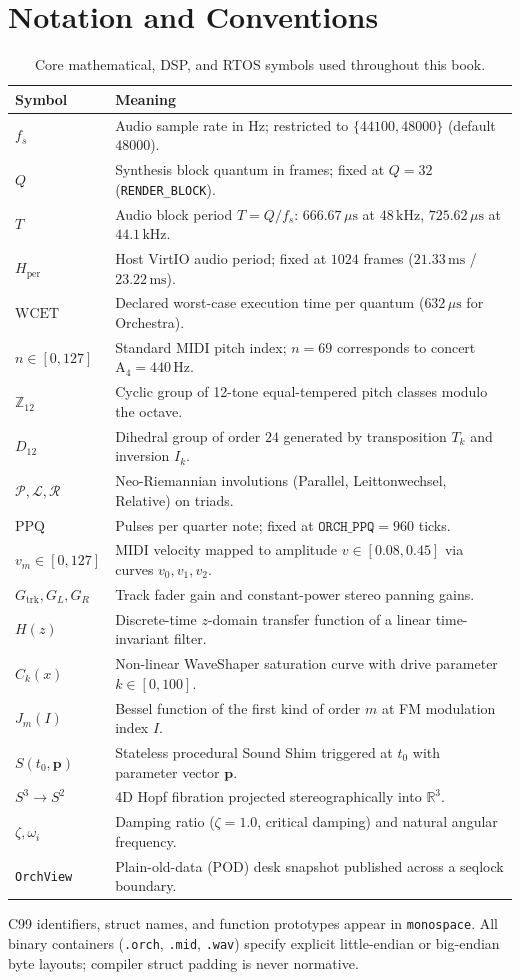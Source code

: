 \chapter{Notation and Conventions}

\begin{table}[htbp]
\centering
\caption{Core mathematical, DSP, and RTOS symbols used throughout this book.}
\begin{tabular}{@{}lp{9.6cm}@{}}
\toprule
Symbol & Meaning \\
\midrule
$f_s$ & Audio sample rate in Hz; restricted to $\{44100, 48000\}$ (default $48000$). \\
$Q$ & Synthesis block quantum in frames; fixed at $Q = 32$ (\texttt{RENDER\_BLOCK}). \\
$T$ & Audio block period $T = Q/f_s$: $666.67\,\mu\text{s}$ at $48\,\text{kHz}$, $725.62\,\mu\text{s}$ at $44.1\,\text{kHz}$. \\
$H_{\text{per}}$ & Host VirtIO audio period; fixed at $1024$ frames ($21.33\,\text{ms}$ / $23.22\,\text{ms}$). \\
$\mathrm{WCET}$ & Declared worst-case execution time per quantum ($632\,\mu\text{s}$ for Orchestra). \\
$n \in [0, 127]$ & Standard MIDI pitch index; $n = 69$ corresponds to concert $\mathrm{A}_4 = 440\,\text{Hz}$. \\
$\mathbb{Z}_{12}$ & Cyclic group of 12-tone equal-tempered pitch classes modulo the octave. \\
$D_{12}$ & Dihedral group of order $24$ generated by transposition $T_k$ and inversion $I_k$. \\
$\mathcal{P}, \mathcal{L}, \mathcal{R}$ & Neo-Riemannian involutions (Parallel, Leittonwechsel, Relative) on triads. \\
$\mathrm{PPQ}$ & Pulses per quarter note; fixed at $\texttt{ORCH\_PPQ} = 960$ ticks. \\
$v_m \in [0, 127]$ & MIDI velocity mapped to amplitude $v \in [0.08, 0.45]$ via curves $v_0, v_1, v_2$. \\
$G_{\mathrm{trk}}, G_L, G_R$ & Track fader gain and constant-power stereo panning gains. \\
$H(z)$ & Discrete-time $z$-domain transfer function of a linear time-invariant filter. \\
$C_k(x)$ & Non-linear WaveShaper saturation curve with drive parameter $k \in [0, 100]$. \\
$J_m(I)$ & Bessel function of the first kind of order $m$ at FM modulation index $I$. \\
$S(t_0, \mathbf{p})$ & Stateless procedural Sound Shim triggered at $t_0$ with parameter vector $\mathbf{p}$. \\
$S^3 \to S^2$ & 4D Hopf fibration projected stereographically into $\mathbb{R}^3$. \\
$\zeta, \omega_i$ & Damping ratio ($\zeta = 1.0$, critical damping) and natural angular frequency. \\
\texttt{OrchView} & Plain-old-data (POD) desk snapshot published across a seqlock boundary. \\
\bottomrule
\end{tabular}
\end{table}

\noindent C99 identifiers, struct names, and function prototypes appear in \texttt{monospace}. All binary containers (\texttt{.orch}, \texttt{.mid}, \texttt{.wav}) specify explicit little-endian or big-endian byte layouts; compiler struct padding is never normative.
